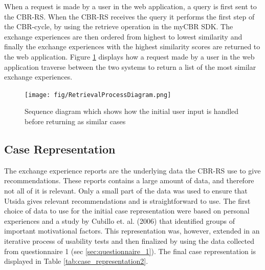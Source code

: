 When a request is made by a user in the web application, a query is first sent to the CBR-RS. When the CBR-RS receives the query it performs the first step of the CBR-cycle, by using the retrieve operation in the myCBR SDK. The exchange experiences are then ordered from highest to lowest similarity and finally the exchange experiences with the highest similarity scores are returned to the web application. Figure \ref{fig:retrieval_process_diagram} displays how a request made by a user in the web application traverse between the two systems to return a list of the most similar exchange experiences.

\begin{figure}[h]
    \centering
    \texttt{[image: fig/RetrievalProcessDiagram.png]}
    \caption{Sequence diagram which shows how the initial user input is handled before returning as similar cases}
    \label{fig:retrieval_process_diagram}
\end{figure}

\subsection{Case Representation}

The exchange experience reports are the underlying data the CBR-RS use to give recommendations. These reports contains a large amount of data, and therefore not all of it is relevant. Only a small part of the data was used to ensure that Utsida gives relevant recommendations and is straightforward to use. The first choice of data to use for the initial case representation were based on personal experiences and a study by Cubillo et. al. (2006) \cite{maria2006international} that identified groups of important motivational factors. This representation was, however, extended in an iterative process of usability tests and then finalized by using the data collected from questionnaire 1 (sec \ref{sec:questionnaire_1}). The final case representation is displayed in Table \ref{tab:case_representation2}. 

